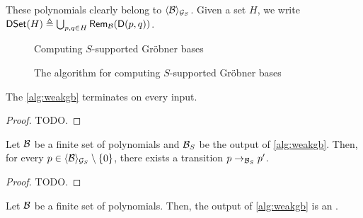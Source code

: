 These polynomials clearly belong to $\gen{\Basis}{\group_S}$.
Given a set $H$, we write $\spolyset(H) \defined \bigcup_{p,q \in H}
\rem{\Basis}{\spoly{p}{q}}$.

\begin{figure}
    \centering
    \begin{algorithm}[H]
        \caption{Computing $S$-supported Gröbner bases}
        \label{alg:weakgb}
    \end{algorithm}
    \caption{The algorithm for computing $S$-supported Gröbner bases}
    \label{fig:weakgb}
\end{figure}

\begin{lemma}
    \label{lem:weakgb-terminates}
    The \cref{alg:weakgb} terminates on every input.
\end{lemma}
\begin{proof}
  TODO.
\end{proof}

\begin{lemma}
    \label{lem:weakgb-correct}
    Let $\Basis$ be a finite set of polynomials
    and $\Basis_S$ be the output of \cref{alg:weakgb}.
    Then, for every $p \in \gen{\Basis}{\group_S} \setminus \set{ 0 }$,
    there exists
    a transition $p \reducstep{\Basis_S} p'$.
\end{lemma}
\begin{proof}
    TODO.
\end{proof}

\begin{theorem}
    \label{thm:weakgb}
    Let $\Basis$ be a finite set of polynomials.
    Then, the output of \cref{alg:weakgb} is an .
\end{theorem}
